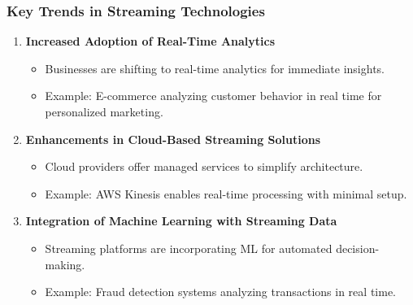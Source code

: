 \documentclass[aspectratio=169]{beamer}
\begin{document}
\begin{frame}[fragile]
    \frametitle{Key Trends in Streaming Technologies}
    \begin{enumerate}
        \item \textbf{Increased Adoption of Real-Time Analytics}
        \begin{itemize}
            \item Businesses are shifting to real-time analytics for immediate insights.
            \item Example: E-commerce analyzing customer behavior in real time for personalized marketing.
        \end{itemize}
        
        \item \textbf{Enhancements in Cloud-Based Streaming Solutions}
        \begin{itemize}
            \item Cloud providers offer managed services to simplify architecture.
            \item Example: AWS Kinesis enables real-time processing with minimal setup.
        \end{itemize}
        
        \item \textbf{Integration of Machine Learning with Streaming Data}
        \begin{itemize}
            \item Streaming platforms are incorporating ML for automated decision-making.
            \item Example: Fraud detection systems analyzing transactions in real time.
        \end{itemize}
    \end{enumerate}
\end{frame}
\end{document}
